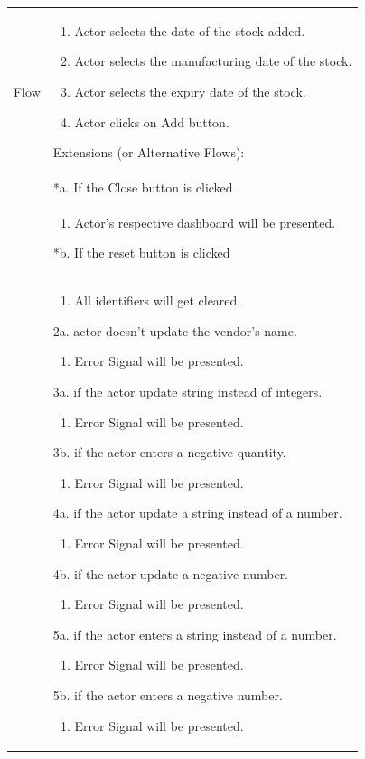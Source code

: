 \documentclass[12pt,a4paper]{report}
\begin{document}
\begin{tabular}{ | m{3cm} | m{12cm}| } \hline
Flow &
\begin{enumerate}
\item Actor selects the date of the stock added.
\item Actor selects the manufacturing date of the stock.
\item Actor selects the expiry date of the stock.
\item Actor clicks on Add button.
\end{enumerate}

Extensions (or Alternative Flows):\\
& *a. If the Close button is clicked \\
& \begin{enumerate}
		\item Actor's respective dashboard will be presented.
	\end{enumerate}
*b. If the reset button is clicked \\
&	\begin{enumerate}
		\item All identifiers will get cleared.
	\end{enumerate}
2a. actor doesn't update the vendor's name.
 	\begin{enumerate}
		\item Error Signal will be presented.
	\end{enumerate}
3a. if the actor update string instead of integers.
 	\begin{enumerate}
		\item Error Signal will be presented.
	\end{enumerate}
3b. if the actor enters a negative quantity.
 	\begin{enumerate}
		\item Error Signal will be presented.
	\end{enumerate}

4a. if the actor update a string instead of a number.
 	\begin{enumerate}
		\item Error Signal will be presented.
	\end{enumerate}
4b. if the actor update a negative number.
 	\begin{enumerate}
		\item Error Signal will be presented.
	\end{enumerate}
5a. if the actor enters a string instead of a number.
 	\begin{enumerate}
		\item Error Signal will be presented.
	\end{enumerate}
5b. if the actor enters a negative number.
 	\begin{enumerate}
		\item Error Signal will be presented.
	\end{enumerate}
\\ \hline
\end{tabular}
\end{document}
